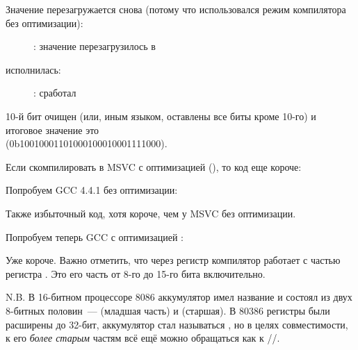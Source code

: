 \clearpage
Значение перезагружается снова (потому что использовался режим компилятора без оптимизации): 

\begin{figure}[H]
\centering
{}
\caption{\olly: значение перезагрузилось в \EDX}
\label{fig:set_reset_olly3}
\end{figure}

\clearpage
\AND исполнилась:

\begin{figure}[H]
\centering
{}
\caption{\olly: \AND сработал}
\label{fig:set_reset_olly4}
\end{figure}

10-й бит очищен (или, иным языком, оставлены все биты кроме 10-го) и итоговое значение это \\
 (0b1001000110100010001{\color{red}0}001111000).


Если скомпилировать в MSVC с оптимизацией (\Ox), то код еще короче:




Попробуем GCC 4.4.1 без оптимизации:



Также избыточный код, хотя короче, чем у MSVC без оптимизации.

Попробуем теперь GCC с оптимизацией \Othree:




Уже короче. Важно отметить, что через регистр \AH компилятор работает с частью регистра \EAX. 
Это его часть от 8-го до 15-го бита включительно.


N.B. В 16-битном процессоре 8086 аккумулятор имел название \AX 
и состоял из двух 8-битных половин~--- \AL (младшая часть) и \AH (старшая). 
В 80386 регистры были расширены до 32-бит, 
аккумулятор стал называться \EAX, но в целях совместимости, к его \emph{более старым} частям всё ещё можно 
обращаться как к \AX/\AH/\AL.

